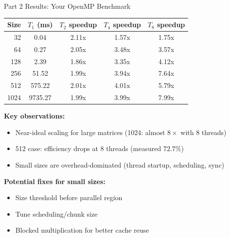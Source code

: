 \documentclass[aspectratio=169]{beamer}
\begin{document}
\begin{frame}{Part 2 Results: Your OpenMP Benchmark}
\scriptsize
\begin{tabular}{rcccc}
\toprule
Size & $T_1$ (ms) & $T_2$ speedup & $T_4$ speedup & $T_8$ speedup \\
\midrule
32   & 0.04    & 2.11x & 1.57x & 1.75x \\
64   & 0.27    & 2.05x & 3.48x & 3.57x \\
128  & 2.39    & 1.86x & 3.35x & 4.12x \\
256  & 51.52   & 1.99x & 3.94x & 7.64x \\
512  & 575.22  & 2.01x & 4.01x & 5.79x \\
1024 & 9735.27 & 1.99x & 3.99x & 7.99x \\
\bottomrule
\end{tabular}

\vspace{0.2cm}
\textbf{Key observations:}
\begin{itemize}
  \item Near-ideal scaling for large matrices (1024: almost $8\times$ with 8 threads)
  \item 512 case: efficiency drops at 8 threads (measured $72.7\%$)
  \item Small sizes are overhead-dominated (thread startup, scheduling, sync)
\end{itemize}

\textbf{Potential fixes for small sizes:}
\begin{itemize}
  \item Size threshold before parallel region
  \item Tune scheduling/chunk size
  \item Blocked multiplication for better cache reuse
\end{itemize}
\end{frame}
\end{document}
